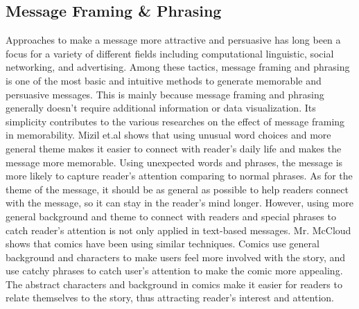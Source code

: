 \subsection{Message Framing \& Phrasing}
Approaches to make a message more attractive and persuasive has long been a focus for a variety of different fields including computational linguistic, social networking, and advertising. Among these tactics, message framing and phrasing is one of the most basic and intuitive methods to generate memorable and persuasive messages. This is mainly because message framing and phrasing generally doesn't require additional information or data visualization. Its simplicity contributes to the various researches on the effect of message framing in memorability. Mizil et.al shows that using unusual word choices and more general theme makes it easier to connect with reader's daily life and makes the message more memorable. Using unexpected words and phrases, the message is more likely to capture reader's attention comparing to normal phrases. As for the theme of the message, it should be as general as possible to help readers connect with the message, so it can stay in the reader's mind longer. However, using more general background and theme to connect with readers and special phrases to catch reader's attention is not only applied in text-based messages. Mr. McCloud shows that comics have been using similar techniques. Comics use general background and characters to make users feel more involved with the story, and use catchy phrases to catch user's attention to make the comic more appealing. The abstract characters and background in comics make it easier for readers to relate themselves to the story, thus attracting reader's interest and attention.\par
